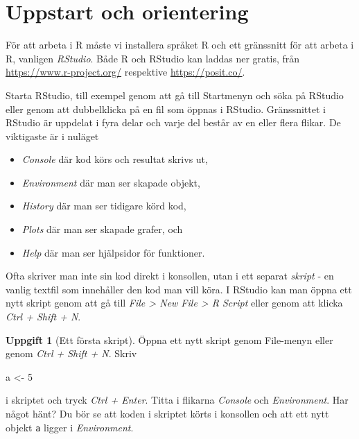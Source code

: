 \documentclass[
]{book}
\newenvironment{Shaded}{\begin{snugshade}}{\end{snugshade}}
\newcommand{\DecValTok}[1]{\textcolor[rgb]{0.00,0.00,0.81}{#1}}
\newcommand{\NormalTok}[1]{#1}
\newcommand{\OtherTok}[1]{\textcolor[rgb]{0.56,0.35,0.01}{#1}}
\providecommand{\tightlist}{%
  \setlength{\itemsep}{0pt}\setlength{\parskip}{0pt}}
\theoremstyle{definition}
\theoremstyle{definition}
\theoremstyle{definition}
\newtheorem{exercise}{Uppgift}[chapter]
\theoremstyle{definition}
\theoremstyle{remark}
\begin{document}
\section{Uppstart och orientering}\label{uppstart-och-orientering}

För att arbeta i R måste vi installera språket R och ett gränssnitt för att arbeta i R, vanligen \emph{RStudio}. Både R och RStudio kan laddas ner gratis, från \url{https://www.r-project.org/} respektive \url{https://posit.co/}.

Starta RStudio, till exempel genom att gå till Startmenyn och söka på RStudio eller genom att dubbelklicka på en fil som öppnas i RStudio.
Gränssnittet i RStudio är uppdelat i fyra delar och varje del består av en eller flera flikar. De viktigaste är i nuläget

\begin{itemize}
\tightlist
\item
  \emph{Console} där kod körs och resultat skrivs ut,
\item
  \emph{Environment} där man ser skapade objekt,
\item
  \emph{History} där man ser tidigare körd kod,
\item
  \emph{Plots} där man ser skapade grafer, och
\item
  \emph{Help} där man ser hjälpsidor för funktioner.
\end{itemize}

Ofta skriver man inte sin kod direkt i konsollen, utan i ett separat \emph{skript} - en vanlig textfil som innehåller den kod man vill köra. I RStudio kan man öppna ett nytt skript genom att gå till \emph{File \textgreater{} New File \textgreater{} R Script} eller genom att klicka \emph{Ctrl + Shift + N}.

\begin{exercise}[Ett första skript]
Öppna ett nytt skript genom File-menyn eller genom \emph{Ctrl + Shift + N}.
Skriv

\begin{Shaded}
\begin{Highlighting}[]
\NormalTok{a }\OtherTok{\textless{}{-}} \DecValTok{5}
\end{Highlighting}
\end{Shaded}

i skriptet och tryck \emph{Ctrl + Enter}. Titta i flikarna \emph{Console} och \emph{Environment}. Har något hänt? Du bör se att koden i skriptet körts i konsollen och att ett nytt objekt \texttt{a} ligger i \emph{Environment}.
\end{exercise}
\end{document}
